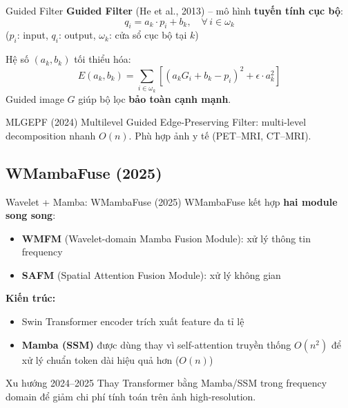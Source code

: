 \documentclass{beamer}
\begin{document}
\begin{frame}{Guided Filter}
    \small
    \textbf{Guided Filter} (He et al., 2013) -- mô hình \textbf{tuyến tính cục bộ}:
    \vspace{-0.1cm}
    \begin{equation}
        q_i = a_k \cdot p_i + b_k, \quad \forall\, i \in \omega_k
    \end{equation}
    \vspace{-0.15cm}
    ($p_i$: input, $q_i$: output, $\omega_k$: cửa sổ cục bộ tại $k$)

    \vspace{0.1cm}
    Hệ số $(a_k, b_k)$ tối thiểu hóa:
    \vspace{-0.1cm}
    \begin{equation}
        E(a_k, b_k) = \sum_{i \in \omega_k} \left[(a_k G_i + b_k - p_i)^2 + \epsilon \cdot a_k^2\right]
    \end{equation}
    \vspace{-0.15cm}
    Guided image $G$ giúp bộ lọc \textbf{bảo toàn cạnh mạnh}.

    \vspace{0.1cm}
    \begin{exampleblock}{\footnotesize MLGEPF (2024)}
        \footnotesize Multilevel Guided Edge-Preserving Filter: multi-level decomposition nhanh $O(n)$. Phù hợp ảnh y tế (PET--MRI, CT--MRI).
    \end{exampleblock}
\end{frame}

\subsection{WMambaFuse (2025)}

\begin{frame}{Wavelet + Mamba: WMambaFuse (2025)}
    WMambaFuse kết hợp \textbf{hai module song song}:
    \begin{itemize}
        \item \textbf{WMFM} (Wavelet-domain Mamba Fusion Module): xử lý thông tin frequency
        \item \textbf{SAFM} (Spatial Attention Fusion Module): xử lý không gian
    \end{itemize}

    \vspace{0.2cm}
    \textbf{Kiến trúc:}
    \begin{itemize}
        \item Swin Transformer encoder trích xuất feature đa tỉ lệ
        \item \textbf{Mamba (SSM)} được dùng thay vì self-attention truyền thống $O(n^2)$ để xử lý chuẩn token dài hiệu quả hơn ($O(n)$)
    \end{itemize}

    \vspace{0.3cm}
    \begin{block}{Xu hướng 2024--2025}
        Thay Transformer bằng Mamba/SSM trong frequency domain để giảm chi phí tính toán trên ảnh high-resolution.
    \end{block}
\end{frame}
\end{document}
